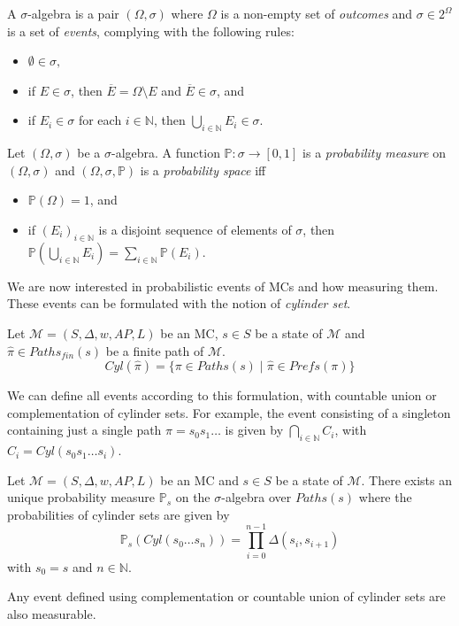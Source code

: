 \begin{definition}
  A $\sigma$-algebra is a pair $(\Omega, \sigma)$ where $\Omega$ is a non-empty set of \textit{outcomes} and $\sigma \in 2^\Omega$ is a set of \textit{events}, complying with the following rules:
  \begin{itemize}
    \item $\emptyset \in \sigma,$
    \item if $E \in \sigma$, then $\overline{E} = \Omega \setminus E$ and $\overline{E} \in \sigma$, and
    \item if $E_i \in \sigma$ for each $i \in \mathbb{N}$, then $\bigcup_{i \in \mathbb{N}} E_i \in \sigma$.
  \end{itemize}
\end{definition}
\begin{definition}
  Let $(\Omega, \sigma)$ be a $\sigma$-algebra. A function $\mathbb{P}: \sigma \rightarrow [0, 1]$ is a \textit{probability measure} on $(\Omega, \sigma)$ and $(\Omega, \sigma, \mathbb{P})$ is a \textit{probability space} iff
  \begin{itemize}
    \item $\mathbb{P}(\Omega) = 1$, and
    \item if $(E_i)_{i \in \mathbb{N}}$ is a disjoint sequence of elements of $\sigma$, then $\mathbb{P}(\bigcup_{i \in \mathbb{N}}E_i) = \sum_{i\in \mathbb{N}}\mathbb{P}(E_i)$.
  \end{itemize}
\end{definition}

We are now interested in probabilistic events of MCs and how measuring them. These events can be formulated with the notion of \textit{cylinder set}.

\begin{definition}
Let $\mathcal{M} = (S, \Delta, w, AP, L)$ be an MC, $s \in S$ be a state of $\mathcal{M}$ and $\hat{\pi} \in Paths_{fin}(s)$ be a finite path of $\mathcal{M}$.
\[Cyl(\hat{\pi})=\{\pi\in Paths(s)\;|\;\hat{\pi}\in Prefs(\pi) \} \]
\end{definition}

We can define all events according to this formulation,
with countable union or complementation of cylinder sets. For example, the event consisting of a singleton containing just a single path $\pi = s_0s_1\dots$ is given by $\bigcap_{i \in \mathbb{N}} C_i$, with $C_i = Cyl(s_0s_1\dots s_i)$.

\begin{theorem}\label{theo1}
  Let $\mathcal{M}=(S, \Delta, w, AP, L)$ be an MC and $s \in S$ be a state of $\mathcal{M}$. There exists an unique probability measure $\mathbb{P}_s$ on the
  $\sigma$-algebra over $Paths(s)$ where the probabilities of cylinder sets are given by
  \[
    \mathbb{P}_s(Cyl(s_0 \dots s_n)) = \prod_{i = 0}^{n - 1} \Delta(s_i, s_{i+1})
  \]
  with $s_0 = s$ and $n \in \mathbb{N}$.
\end{theorem}
\begin{corollary}
Any event defined using complementation or countable union of cylinder sets are also measurable.
\end{corollary}


